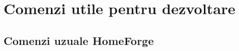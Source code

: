 \appendix
\chapter{Comenzi utile pentru dezvoltare}

\section{Comenzi uzuale HomeForge}
\inputminted{bash}{cod/comenzi_uzuale.sh}

